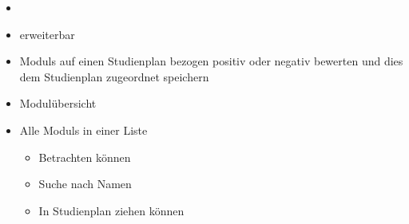 \begin{itemize}[nosep]
\begin{itemize}[nosep]
\begin{itemize}[nosep]
			\item Sind alle \glspl{Constraint} erfüllt?
		\end{itemize}
	\end{itemize}
	\item {}
	\item {} erweiterbar	 
	\item \glspl{Modul} auf einen \gls{Studienplan} bezogen positiv oder negativ bewerten und dies dem \gls{Studienplan} zugeordnet speichern
	\item Modulübersicht
		\item Alle \glspl{Modul} in einer Liste
			\begin{itemize}[nosep]
				\item Betrachten können
				\item Suche nach Namen
				\item In \gls{Studienplan} ziehen können
			\end{itemize}
\end{itemize}

